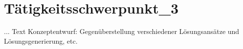\chapter{Tätigkeitsschwerpunkt_3}
\label{cha:Tätigkeitsschwerpunkt_3}

... Text Konzeptentwurf: Gegenüberstellung verschiedener Lösungsansätze und Lösungsgenerierung, etc.
